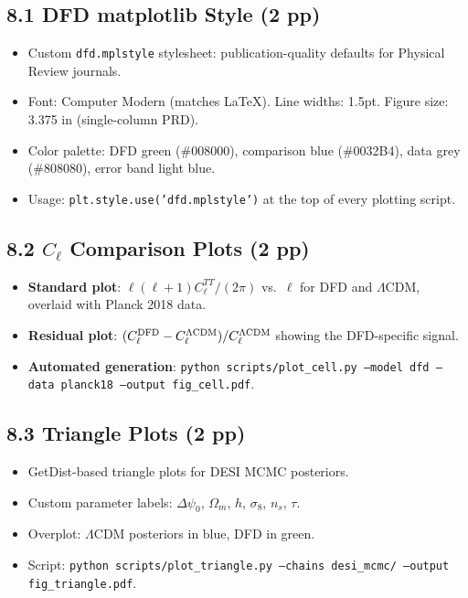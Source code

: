 \documentclass[11pt,a4paper]{article}
\begin{document}
\subsection{8.1 DFD matplotlib Style (2 pp)}

\begin{itemize}
\item Custom \texttt{dfd.mplstyle} stylesheet: publication-quality defaults for Physical Review journals.
\item Font: Computer Modern (matches LaTeX). Line widths: 1.5pt. Figure size: 3.375 in (single-column PRD).
\item Color palette: DFD green (\#008000), comparison blue (\#0032B4), data grey (\#808080), error band light blue.
\item Usage: \texttt{plt.style.use('dfd.mplstyle')} at the top of every plotting script.
\end{itemize}

\subsection{8.2 $C_\ell$ Comparison Plots (2 pp)}

\begin{itemize}
\item \textbf{Standard plot}: $\ell(\ell+1)C_\ell^{TT}/(2\pi)$ vs.\ $\ell$ for DFD and $\Lambda$CDM, overlaid with Planck 2018 data.
\item \textbf{Residual plot}: $(C_\ell^{\rm DFD} - C_\ell^{\Lambda{\rm CDM}}) / C_\ell^{\Lambda{\rm CDM}}$ showing the DFD-specific signal.
\item \textbf{Automated generation}: \texttt{python scripts/plot\_cell.py --model dfd --data planck18 --output fig\_cell.pdf}.
\end{itemize}

\subsection{8.3 Triangle Plots (2 pp)}

\begin{itemize}
\item GetDist-based triangle plots for DESI MCMC posteriors.
\item Custom parameter labels: $\Delta\psi_0$, $\Omega_m$, $h$, $\sigma_8$, $n_s$, $\tau$.
\item Overplot: $\Lambda$CDM posteriors in blue, DFD in green.
\item Script: \texttt{python scripts/plot\_triangle.py --chains desi\_mcmc/ --output fig\_triangle.pdf}.
\end{itemize}
\end{document}
